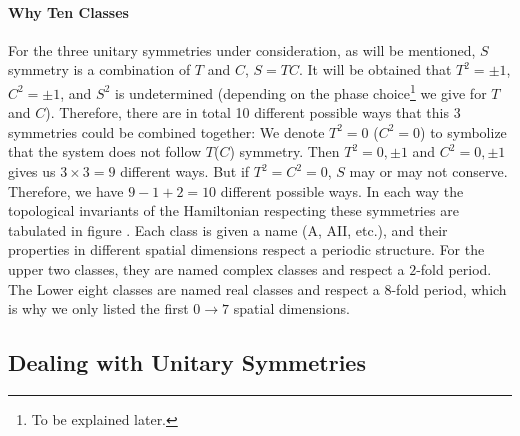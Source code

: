 \documentclass{article}
\begin{document}
\paragraph{Why Ten Classes} For the three unitary symmetries under
consideration, as will be mentioned, $S$ symmetry is a combination of $T$ and
$C$, $S=TC$. It will be obtained that $T^2=\pm 1$, $C^2=\pm 1$, and $S^2$ is
undetermined (depending on the phase choice\footnote{To be explained later.} we
give for $T$ and $C$). Therefore, there are in total 10 different possible ways
that this 3 symmetries could be combined together: We denote $T^2=0$ ($C^2=0$)
to symbolize that the system does not follow $T$($C$) symmetry. Then
$T^2=0,\pm1$ and $C^2=0,\pm1$ gives us $3\times 3=9$ different ways. But if
$T^2=C^2=0$, $S$ may or may not conserve. Therefore, we have $9-1+2=10$
different possible ways. In each way the topological invariants of the
Hamiltonian respecting these symmetries are tabulated in figure . Each class is given a name ($\mathrm{A}$, $\mathrm{AII}$, etc.),
and their properties in different spatial dimensions respect a periodic
structure. For the upper two classes, they are named complex classes and respect
a $2$-fold period. The Lower eight classes are named real classes and respect a
$8$-fold period, which is why we only listed the first $0\to 7$ spatial
dimensions.

\subsection{Dealing with Unitary Symmetries}
\label{sec:Dealing with Unitary Symmetries}
\end{document}
